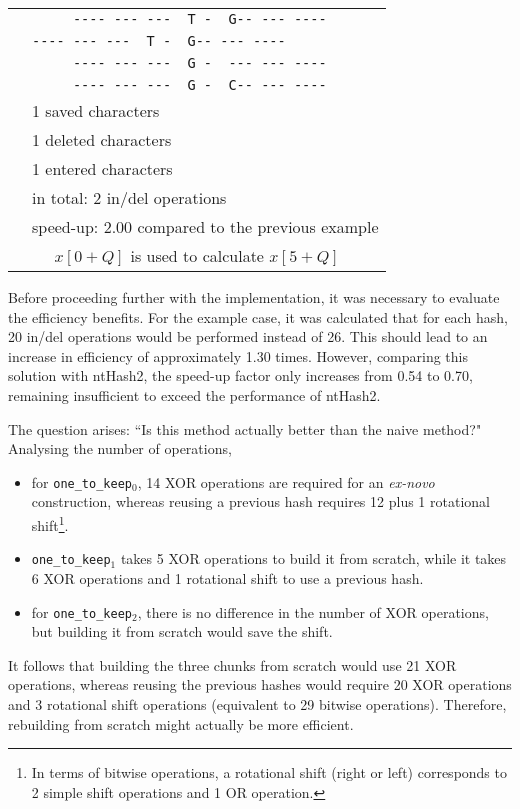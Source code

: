 \begin{example}
	\begin{center}
		\begin{tabular}{c | l}
			\multirow{9}{*}{\rotatebox[origin=c]{90}{$\texttt{one\_to\_keep}_2$}}
			& \verb|     ---- --- ---  T -  G-- --- ----| \\
			& \verb|---- --- ---  T -  G-- --- ----     | \\
			& \verb|     ---- --- ---  G -  --- --- ----| \\
			& \verb|     ---- --- ---  G -  C-- --- ----| \\
			\cmidrule{2-2}
			& 1 saved characters \\
			& 1 deleted characters \\
			& 1 entered characters \\
			\cmidrule{2-2}
			& in total: 2 in/del operations \\%
			& speed-up: 2.00 compared to the previous example \\
			\bottomrule
			\multicolumn{2}{c}{$x[0 + Q]$ is used to calculate $x[5 + Q]$} \\
		\end{tabular}
	\end{center}
\end{example}

Before proceeding further with the implementation, it was necessary to evaluate the efficiency benefits. For the example case, it was calculated that for each hash, 20 in/del operations would be performed instead of 26. This should lead to an increase in efficiency of approximately 1.30 times. However, comparing this solution with ntHash2, the speed-up factor only increases from 0.54 to 0.70, remaining insufficient to exceed the performance of ntHash2.

The question arises: “Is this method actually better than the naive method?" Analysing the number of operations,
\begin{itemize}
	\item for \verb|one_to_keep|$_0$, 14 XOR operations are required for an \emph{ex-novo} construction, whereas reusing a previous hash requires 12 plus 1 rotational shift\footnote{In terms of bitwise operations, a rotational shift (right or left) corresponds to 2 simple shift operations and 1 OR operation.}.
	\item \verb|one_to_keep|$_1$ takes 5 XOR operations to build it from scratch, while it takes 6 XOR operations and 1 rotational shift to use a previous hash.
	\item for \verb|one_to_keep|$_2$, there is no difference in the number of XOR operations, but building it from scratch would save the shift.
\end{itemize}
It follows that building the three chunks from scratch would use 21 XOR operations, whereas reusing the previous hashes would require 20 XOR operations and 3 rotational shift operations (equivalent to 29 bitwise operations). Therefore, rebuilding from scratch might actually be more efficient.



